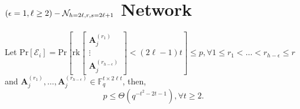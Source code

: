 \section{$\left(\epsilon=1,\ell\protect\geq2\right)-\mathcal{N}_{h=2\ell,r,s=2\ell+1}$
Network}
\begin{lem}
\label{lem:p_e1l2} Let $\mathrm{Pr}\left[\mathcal{E}_{i}\right]=\mathrm{Pr}\left[\mathrm{rk}\left[\begin{array}{c}
\boldsymbol{A}_{j}^{\left(r_{1}\right)}\\
\vdots\\
\boldsymbol{A}_{j}^{\left(r_{h-\epsilon}\right)}
\end{array}\right]<\left(2\ell-1\right)t\right]\leq p,\forall1\leq r_{1}<\ldots<r_{h-\epsilon}\leq r$ and $\boldsymbol{A}_{j}^{\left(r_{1}\right)},\ldots,\boldsymbol{A}_{j}^{\left(r_{h-\epsilon}\right)}\in\ensuremath{\mathbb{F}}_{q}^{t\times2\ell t}$,
then,
\[
p\leq\Theta\left(q^{-t^{2}-2t-1}\right),\forall t\geq2.
\]
\end{lem}
